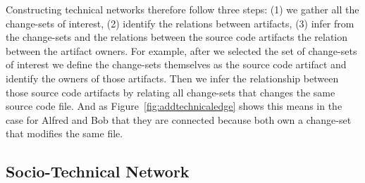 Constructing technical networks therefore follow three steps: (1) we gather all the change-sets of interest, (2) identify the relations between artifacts, (3) infer from the change-sets and the relations between the source code artifacts the relation between the artifact owners.
For example, after we selected the set of change-sets of interest we define the change-sets themselves as the source code artifact and identify the owners of those artifacts.
Then we infer the relationship between those source code artifacts by relating all change-sets that changes the same source code file.
And as Figure~\ref{fig:addtechnicaledge} shows this means in the case for Alfred and Bob that they are connected because both own a change-set that modifies the same file.

\subsection{Socio-Technical Network}
